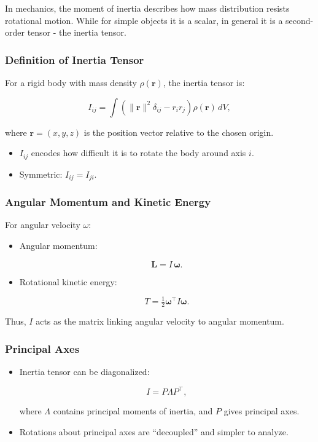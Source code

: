 \documentclass[
  letterpaper,
  DIV=11,
  numbers=noendperiod]{scrreprt}
\providecommand{\tightlist}{%
  \setlength{\itemsep}{0pt}\setlength{\parskip}{0pt}}
\begin{document}
In mechanics, the moment of inertia describes how mass distribution
resists rotational motion. While for simple objects it is a scalar, in
general it is a second-order tensor - the inertia tensor.

\subsubsection{Definition of Inertia
Tensor}\label{definition-of-inertia-tensor}

For a rigid body with mass density \(\rho(\mathbf{r})\), the inertia
tensor is:

\[
I_{ij} = \int \left( \|\mathbf{r}\|^2 \delta_{ij} - r_i r_j \right) \rho(\mathbf{r}) \, dV,
\]

where \(\mathbf{r} = (x,y,z)\) is the position vector relative to the
chosen origin.

\begin{itemize}
\tightlist
\item
  \(I_{ij}\) encodes how difficult it is to rotate the body around axis
  \(i\).
\item
  Symmetric: \(I_{ij} = I_{ji}\).
\end{itemize}

\subsubsection{Angular Momentum and Kinetic
Energy}\label{angular-momentum-and-kinetic-energy}

For angular velocity \(\omega\):

\begin{itemize}
\item
  Angular momentum:

  \[
  \mathbf{L} = I \, \boldsymbol{\omega}.
  \]
\item
  Rotational kinetic energy:

  \[
  T = \tfrac{1}{2} \boldsymbol{\omega}^\top I \boldsymbol{\omega}.
  \]
\end{itemize}

Thus, \(I\) acts as the matrix linking angular velocity to angular
momentum.

\subsubsection{Principal Axes}\label{principal-axes}

\begin{itemize}
\item
  Inertia tensor can be diagonalized:

  \[
  I = P \Lambda P^\top,
  \]

  where \(\Lambda\) contains principal moments of inertia, and \(P\)
  gives principal axes.
\item
  Rotations about principal axes are ``decoupled'' and simpler to
  analyze.
\end{itemize}
\end{document}
